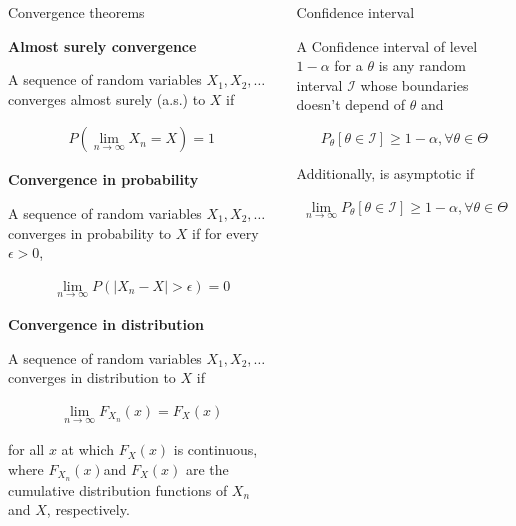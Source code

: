 \documentclass{beamer}
\begin{document}
\begin{frame}
\begin{columns}
\begin{column}{0.3\textwidth}
\begin{block}{Convergence theorems}

\textbf{Almost surely convergence}

A sequence of random variables $X_1, X_2, \ldots$ converges almost surely (a.s.) to $X$ if 

\begin{align*}
  P\left( \lim_{n \to \infty} X_n = X \right) = 1  
\end{align*}

\textbf{Convergence in probability}

A sequence of random variables $X_1, X_2, \ldots$ converges in probability to \(X\) if for every $\epsilon > 0$,

\begin{align*}
   \lim_{n \to \infty} P(|X_n - X| > \epsilon) = 0 
\end{align*}

\textbf{Convergence in distribution}

A sequence of random variables $X_1, X_2, \ldots$ converges in distribution to $X$ if 

\begin{align*}
    \lim_{n \to \infty} F_{X_n}(x) = F_X(x)
\end{align*}

for all $x$ at which \(F_X(x)\) is continuous, where $F_{X_n}(x)$and $F_X(x)$ are the cumulative distribution functions of $X_n$ and $X$, respectively.

\end{block}

\end{column}

\begin{column}{0.3\textwidth}

\begin{block}{Confidence interval}

A Confidence interval of level $1-\alpha$ for a $\theta$ is any random interval $\mathcal{I}$ whose boundaries doesn't depend of $\theta$ and

\begin{align*}
    P_\theta[\theta \in \mathcal{I}] \geq 1 - \alpha, \forall \theta \in \Theta
\end{align*}

Additionally, is asymptotic if

\begin{align*}
    \lim_{n \to \infty} P_\theta[\theta \in \mathcal{I}] \geq 1 - \alpha, \forall \theta \in \Theta
\end{align*}


\end{block}
\end{column}
\end{columns}
\end{frame}
\end{document}
